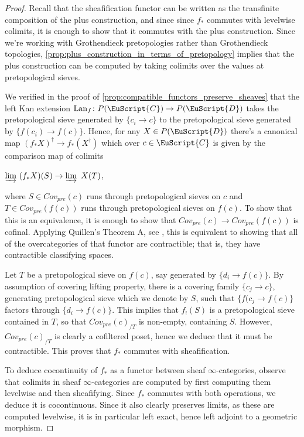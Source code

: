 \documentclass[oneside,a4paper]{amsart}
\newcommand{\euscr}[1]{\EuScript{#1}} %
\newcommand{\ccat}{\euscr{C}} %
\newcommand{\dcat}{\euscr{D}} %
\theoremstyle{plain}
\theoremstyle{definition}
\theoremstyle{remark}
\begin{document}
\begin{proof}
Recall that the sheafification functor can be written as the transfinite composition of the plus construction, and since since $f_{*}$ commutes with levelwise colimits, it is enough to show that it commutes with the plus construction. Since we're working with Grothendieck pretopologies rather than Grothendieck topologies, \cref{prop:plus_construction_in_terms_of_pretopology} implies that the plus construction can be computed by taking colimits over the values at pretopological sieves. 

We verified in the proof of \cref{prop:compatible_functors_preserve_sheaves} that the left Kan extension $\mathrm{Lan}_{f} \colon P(\ccat) \rightarrow P(\dcat)$ takes the pretopological sieve generated by $\{ c_{i} \rightarrow c \}$ to the pretopological sieve generated by $\{ f(c_{i}) \rightarrow f(c) \}$. Hence, for any $X \in P(\dcat)$ there's a canonical map $(f_{*}X)^{\dagger} \rightarrow f_{*} (X^{\dagger})$ which over $c \in \ccat$ is given by the comparison map of colimits

\begin{center}
$\varinjlim \ (f_{*}X)(S) \rightarrow \varinjlim \ X(T)$,
\end{center}
where $S \in Cov_{pre}(c)$ runs through pretopological sieves on $c$ and $T \in Cov_{pre}(f(c))$ runs through pretopological sieves on $f(c)$. To show that this is an equivalence, it is enough to show that $Cov_{pre}(c) \rightarrow Cov_{pre}(f(c))$ is cofinal. Applying Quillen's Theorem A, see \cite[4.1.3.1]{lurie_higher_topos_theory}, this is equivalent to showing that all of the overcategories of that functor are contractible; that is, they have contractible classifying spaces. 

Let $T$ be a pretopological sieve on $f(c)$, say generated by $\{ d_{i} \rightarrow f(c) \}$. By assumption of covering lifting property, there is a covering family $\{ c_{j} \rightarrow c \}$, generating pretopological sieve which we denote by $S$, such that $\{ f(c_{j} \rightarrow f(c) \}$ factors through $\{ d_{i} \rightarrow f(c) \}$. This implies that $f_{!}(S)$ is a pretopological sieve contained in $T$, so that $Cov_{pre}(c)_{/T}$ is non-empty, containing $S$. However, $Cov_{pre}(c)_{/T}$ is clearly a cofiltered poset, hence we deduce that it must be contractible. This proves that $f_{*}$ commutes with sheafification. 

To deduce cocontinuity of $f_{*}$ as a functor between sheaf $\infty$-categories, observe that colimits in sheaf $\infty$-categories are computed by first computing them levelwise and then sheafifying. Since $f_{*}$ commutes with both operations, we deduce it is cocontinuous. Since it also clearly preserves limits, as these are computed levelwise, it is in particular left exact, hence left adjoint to a geometric morphism. 
\end{proof}
\end{document}
